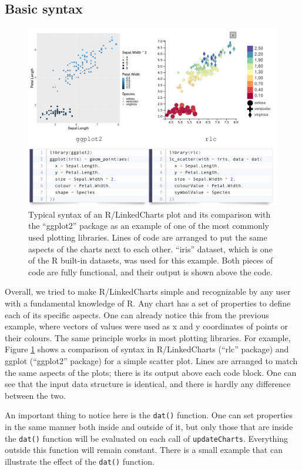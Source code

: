 \documentclass[twocolumn,10pt]{article}
\begin{document}
\subsection{Basic syntax}

\begin{figure}[t]
	\includegraphics[width=\textwidth]{FigB/figB.png}
	\caption{Typical syntax of an R/LinkedCharts plot and its comparison with the ``ggplot2'' \citep{wickham_2016} package as an example of one of the most commonly used plotting libraries. Lines of code are arranged to put the same aspects of the charts next to each other. ``iris'' dataset, which is one of the R built-in datasets, was used for this example. Both pieces of code are fully functional, and their output is shown above the code.}
	\label{FigB}
\end{figure}

Overall, we tried to make R/LinkedCharts simple and recognizable by any user with a fundamental knowledge of R. Any chart has a set of properties to define each of its specific aspects. One can already notice this from the previous example, where vectors of values were used as x and y coordinates of points or their colours. The same principle works in most plotting libraries. For example, Figure \ref{FigB} shows a comparison of syntax in R/LinkedCharts (``rlc'' package) and ggplot (``ggplot2'' \citep{wickham_2016} package) for a simple scatter plot. Lines are arranged to match the same aspects of the plots; there is its output above each code block. One can see that the input data structure is identical, and there is hardly any difference between the two.

An important thing to notice here is the \texttt{dat()} function. One can set properties in the same manner both inside and outside of it, but only those that are inside the \texttt{dat()} function will be evaluated on each call of \texttt{updateCharts}. Everything outside this function will remain constant. There is a small example that can illustrate the effect of the \texttt{dat()} function.
\end{document}
